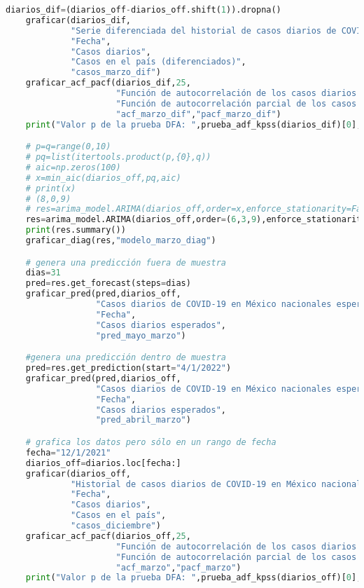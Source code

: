 \documentclass[11pt,letterpaper]{article}
\theoremstyle{definition}
\theoremstyle{theorem}
\theoremstyle{remark}
\begin{document}
\begin{appendices}
\begin{lstlisting}[language=Python]
    diarios_dif=(diarios_off-diarios_off.shift(1)).dropna()
    graficar(diarios_dif,
             "Serie diferenciada del historial de casos diarios de COVID-19 en México nacionales,\nMarzo a Mayo de 2022",
             "Fecha",
             "Casos diarios",
             "Casos en el país (diferenciados)",
             "casos_marzo_dif")
    graficar_acf_pacf(diarios_dif,25,
                      "Función de autocorrelación de los casos diarios de COVID-19 diferenciados\na partir de marzo del 2022",
                      "Función de autocorrelación parcial de los casos diarios de COVID-19 diferenciados\na partir de marzo del 2022",
                      "acf_marzo_dif","pacf_marzo_dif")
    print("Valor p de la prueba DFA: ",prueba_adf_kpss(diarios_dif)[0],"\nValor p de la prueba KPSS:",prueba_adf_kpss(diarios_dif)[1])

    # p=q=range(0,10)
    # pq=list(itertools.product(p,{0},q))
    # aic=np.zeros(100)
    # x=min_aic(diarios_off,pq,aic)
    # print(x)
    # (8,0,9)
    # res=arima_model.ARIMA(diarios_off,order=x,enforce_stationarity=False,enforce_invertibility=False).fit()
    res=arima_model.ARIMA(diarios_off,order=(6,3,9),enforce_stationarity=False,enforce_invertibility=False).fit()
    print(res.summary())
    graficar_diag(res,"modelo_marzo_diag")

    # genera una predicción fuera de muestra
    dias=31
    pred=res.get_forecast(steps=dias)
    graficar_pred(pred,diarios_off,
                  "Casos diarios de COVID-19 en México nacionales esperados a partir de Mayo del 2022\ncon datos de Marzo y Abril del 2022",
                  "Fecha",
                  "Casos diarios esperados",
                  "pred_mayo_marzo")

    #genera una predicción dentro de muestra
    pred=res.get_prediction(start="4/1/2022")
    graficar_pred(pred,diarios_off,
                  "Casos diarios de COVID-19 en México nacionales esperados a partir de Abril del 2022\ncon datos de Marzo y Abril del 2022",
                  "Fecha",
                  "Casos diarios esperados",
                  "pred_abril_marzo")

    # grafica los datos pero sólo en un rango de fecha
    fecha="12/1/2021"
    diarios_off=diarios.loc[fecha:]
    graficar(diarios_off,
             "Historial de casos diarios de COVID-19 en México nacionales,\nDiciembre de 2021 a Mayo de 2022",
             "Fecha",
             "Casos diarios",
             "Casos en el país",
             "casos_diciembre")
    graficar_acf_pacf(diarios_off,25,
                      "Función de autocorrelación de los casos diarios de COVID-19\na partir de diciembre del 2021",
                      "Función de autocorrelación parcial de los casos diarios de COVID-19\na partir de diciembre del 2021",
                      "acf_marzo","pacf_marzo")
    print("Valor p de la prueba DFA: ",prueba_adf_kpss(diarios_off)[0],"\nValor p de la prueba KPSS:",prueba_adf_kpss(diarios_off)[1])


\end{lstlisting}
\end{appendices}
\end{document}
